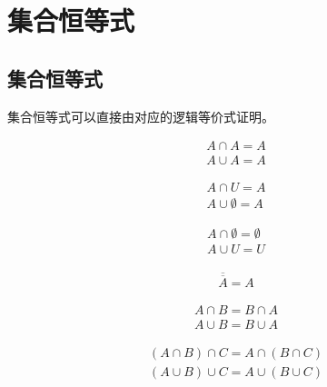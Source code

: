\documentclass[12pt, openany, oneside]{book}
\begin{document}
\section{集合恒等式}

\subsection{集合恒等式}

集合恒等式可以直接由对应的逻辑等价式证明。

\begin{tcolorbox}
	\begin{align}
		A \cap A = A \\
		A \cup A = A
	\end{align}
\end{tcolorbox}

\begin{tcolorbox}
	\begin{align}
		A \cap U = A \\
		A \cup \emptyset = A
	\end{align}
\end{tcolorbox}

\begin{tcolorbox}
	\begin{align}
		A \cap \emptyset = \emptyset \\
		A \cup U = U
	\end{align}
\end{tcolorbox}

\begin{tcolorbox}
	\begin{align}
		\overline {\overline A} = A
	\end{align}
\end{tcolorbox}

\begin{tcolorbox}
	\begin{align}
		A \cap B = B \cap A \\
		A \cup B = B \cup A
	\end{align}
\end{tcolorbox}

\begin{tcolorbox}
	\begin{align}
		(A \cap B) \cap C = A \cap (B \cap C) \\
		(A \cup B) \cup C = A \cup (B \cup C)
	\end{align}
\end{tcolorbox}
\end{document}
